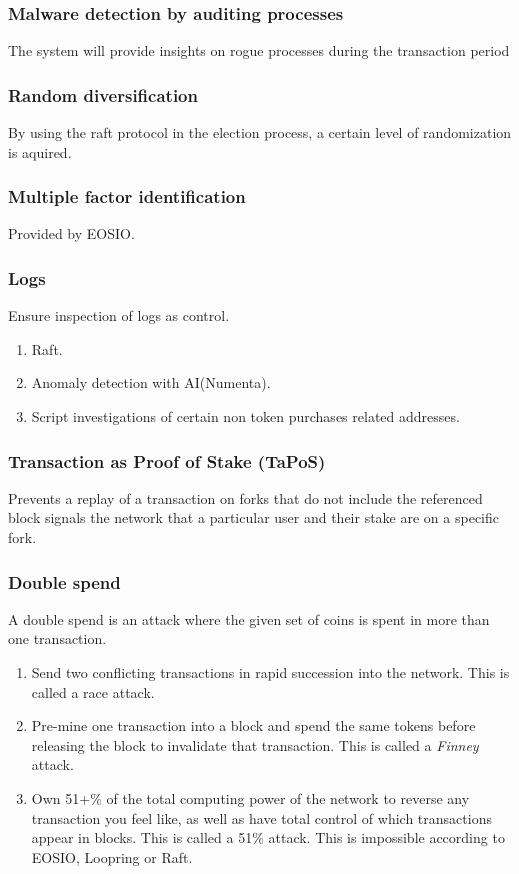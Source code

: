 \documentclass[]{article}
\begin{document}
		\subsubsection{Malware detection by auditing processes}
		The system will provide insights on rogue processes during the transaction period 
		\subsubsection{Random diversification}
		By using the raft protocol in the election process, a certain level of randomization is aquired.
		\subsubsection{Multiple factor identification}
		Provided by EOSIO.
		\subsubsection {Logs}
			Ensure inspection of logs as control.
			\begin{enumerate}
				\item Raft.
				\item Anomaly detection with AI(Numenta).
				\item Script investigations of certain non token purchases related addresses.
			\end{enumerate}
		\subsubsection{Transaction as Proof of Stake (TaPoS)}
			Prevents a replay of a transaction on forks that do not include the referenced block signals the network that a particular user and their stake are on a specific fork.
		\subsubsection{Double spend}
		A double spend is an attack where the given set of coins is spent in more than one transaction.
		\begin{enumerate}
			\item Send two conflicting transactions in rapid succession into the network. This is called a race attack. 
			\item Pre-mine one transaction into a block and spend the same tokens before releasing the block to invalidate that transaction. This is called a \textit{Finney} attack.
			\item Own 51+\% of the total computing power of the network to reverse any transaction you feel like, as well as have total control of which transactions appear in blocks. This is called a 51\% attack.
			This is impossible according to EOSIO, Loopring or Raft. 
		\end{enumerate} 
\end{document}
